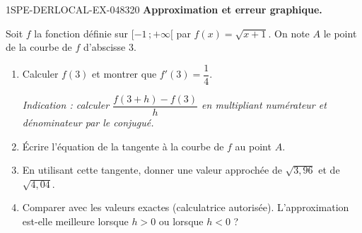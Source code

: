 \begin{exercice}{1SPE-DERLOCAL-EX-048}{3}{20}
\textbf{Approximation et erreur graphique.}

Soit $f$ la fonction définie sur $[-1\,;+\infty[$ par $f(x) = \sqrt{x + 1}$. On note $A$ le point de la courbe de $f$ d'abscisse $3$.

\begin{enumerate}
  \item Calculer $f(3)$ et montrer que $f'(3) = \dfrac{1}{4}$.

  \emph{Indication : calculer $\dfrac{f(3+h) - f(3)}{h}$ en multipliant numérateur et dénominateur par le conjugué.}
  \item Écrire l'équation de la tangente à la courbe de $f$ au point $A$.
  \item En utilisant cette tangente, donner une valeur approchée de $\sqrt{3{,}96}$ et de $\sqrt{4{,}04}$.
  \item Comparer avec les valeurs exactes (calculatrice autorisée). L'approximation est-elle meilleure lorsque $h > 0$ ou lorsque $h < 0$ ?
\end{enumerate}
\end{exercice}

